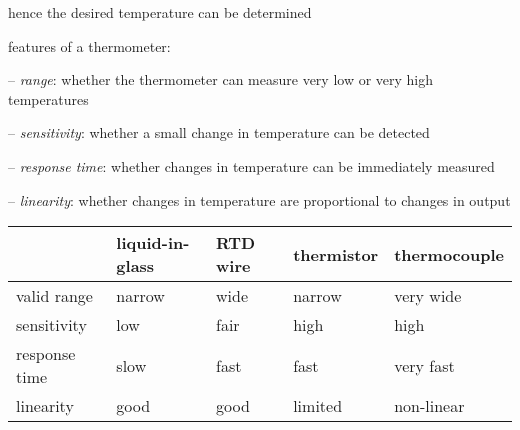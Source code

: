 hence the desired temperature can be determined

\vspace*{\baselineskip}

\cmt features of a thermometer:
\begin{compactitem}
	\item[--] \emph{range}: whether the thermometer can measure very low or very high temperatures
	
	\item[--] \emph{sensitivity}: whether a small change in temperature can be detected
	
	\item[--] \emph{response time}: whether changes in temperature can be immediately measured
	
	\item[--] \emph{linearity}: whether changes in temperature are proportional to changes in output
	
\end{compactitem}

%

\begin{center}
	\begin{tabular}{|l|C{2.4cm}|C{2.4cm}|C{2.4cm}|C{2.4cm}|}
		\hline 
		& liquid-in-glass & RTD wire & thermistor & thermocouple \\ 
		\hline 
		valid range & narrow & wide & narrow & very wide \\ 
		\hline 
		sensitivity & low & fair & high & high \\ 
		\hline 
		response time & slow & fast & fast & very fast \\ 
		\hline 
		linearity & good & good & limited & non-linear \\ 
		\hline 
	\end{tabular} 
\end{center}


